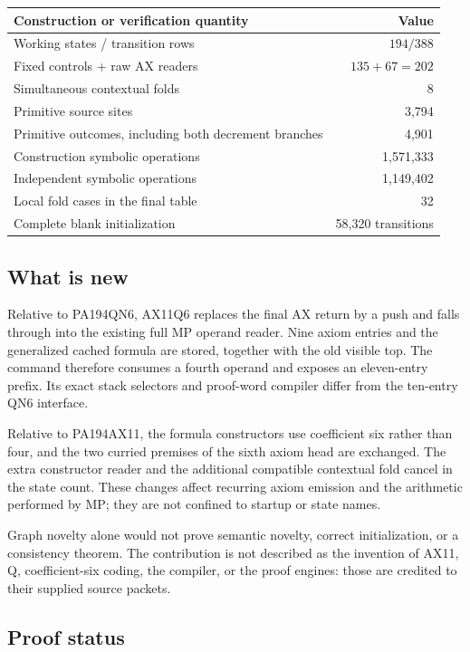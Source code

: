 \documentclass[10pt,letterpaper]{article}
\begin{document}
\begin{center}
\begin{tabular}{lr}
\toprule
Construction or verification quantity & Value\\
\midrule
Working states / transition rows & $194/388$\\
Fixed controls + raw AX readers & $135+67=202$\\
Simultaneous contextual folds & 8\\
Primitive source sites & 3,794\\
Primitive outcomes, including both decrement branches & 4,901\\
Construction symbolic operations & 1,571,333\\
Independent symbolic operations & 1,149,402\\
Local fold cases in the final table & 32\\
Complete blank initialization & 58,320 transitions\\
\bottomrule
\end{tabular}
\end{center}

\subsection{What is new}

Relative to PA194QN6, AX11Q6 replaces the final AX return by a push and
falls through into the existing full MP operand reader. Nine axiom entries
and the generalized cached formula are stored, together with the old visible top. The command
therefore consumes a fourth operand and exposes an eleven-entry prefix.
Its exact stack selectors and proof-word compiler differ from the ten-entry
QN6 interface.

Relative to PA194AX11, the formula constructors use coefficient six rather
than four, and the two curried premises of the sixth axiom head are exchanged.
The extra constructor reader and the additional compatible contextual fold
cancel in the state count. These changes affect recurring axiom
emission and the arithmetic performed by MP; they are not confined to
startup or state names.

Graph novelty alone would not prove semantic novelty, correct initialization,
or a consistency theorem. The contribution is not described as
the invention of AX11, Q, coefficient-six coding, the compiler, or the proof
engines: those are credited to their supplied source packets.

\subsection{Proof status}
\end{document}
